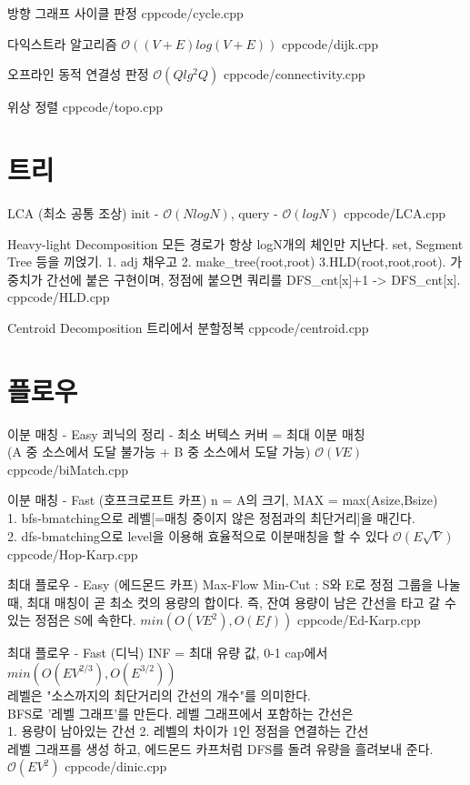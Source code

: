 \documentclass[landscape, 10pt, a4paper, oneside, twocolumn]{extarticle}
\begin{document}
\Algorithm
{방향 그래프 사이클 판정}
{}
{}
{cpp}{code/cycle.cpp}

\Algorithm
{다익스트라 알고리즘}
{}
{$\mathcal{O}((V+E)log(V+E))$}
{cpp}{code/dijk.cpp}

\Algorithm
{오프라인 동적 연결성 판정}
{}
{$\mathcal{O}(Qlg^2Q)$}
{cpp}{code/connectivity.cpp}

\Algorithm
{위상 정렬}
{}
{}
{cpp}{code/topo.cpp}


\section{트리}

\Algorithm
{LCA (최소 공통 조상)}
{}
{init - $\mathcal{O}(NlogN)$, query - $\mathcal{O}(logN)$}
{cpp}{code/LCA.cpp}

\Algorithm
{Heavy-light Decomposition}
{모든 경로가 항상 logN개의 체인만 지난다. set, Segment Tree 등을 끼얹기. 1. adj 채우고 2. make\_tree(root,root) 3.HLD(root,root,root). 가중치가 간선에 붙은 구현이며, 정점에 붙으면 쿼리를 DFS\_cnt[x]+1 -> DFS\_cnt[x].
}
{}
{cpp}{code/HLD.cpp}

\Algorithm
{Centroid Decomposition}
{트리에서 분할정복
}
{}
{cpp}{code/centroid.cpp}




\section{플로우}

\Algorithm
{이분 매칭 - Easy}
{ 쾨닉의 정리 - 최소 버텍스 커버 = 최대 이분 매칭
\\(A 중 소스에서 도달 불가능 + B 중 소스에서 도달 가능)}
{$\mathcal{O}(VE)$}
{cpp}{code/biMatch.cpp}

\Algorithm
{이분 매칭 - Fast (호프크로프트 카프)}
{n = A의 크기, MAX = max(Asize,Bsize)\\
1. bfs-bmatching으로 레벨[=매칭 중이지 않은 정점과의 최단거리]을 매긴다.\\
2. dfs-bmatching으로 level을 이용해 효율적으로 이분매칭을 할 수 있다
}
{$\mathcal{O}(E \sqrt{V})$}
{cpp}{code/Hop-Karp.cpp}

\Algorithm
{최대 플로우 - Easy (에드몬드 카프)}
{Max-Flow Min-Cut : S와 E로 정점 그룹을 나눌 때, 최대 매칭이 곧 최소 컷의 용량의 합이다. 즉, 잔여 용량이 남은 간선을 타고 갈 수 있는 정점은 S에 속한다.}
{$\mathcal {}min({O}(VE^2), {O}(Ef))$}
{cpp}{code/Ed-Karp.cpp}

\Algorithm
{최대 플로우 - Fast (디닉)}
{INF = 최대 유량 값, 0-1 cap에서 $\mathcal {}min({O}(EV^{2/3}), {O}(E^{3/2}))$\\
레벨은 "소스까지의 최단거리의 간선의 개수"를 의미한다.\\
BFS로 '레벨 그래프'를 만든다. 레벨 그래프에서 포함하는 간선은\\
1. 용량이 남아있는 간선 2. 레벨의 차이가 1인 정점을 연결하는 간선\\
레벨 그래프를 생성 하고, 에드몬드 카프처럼 DFS를 돌려 유량을 흘려보내 준다.
}
{$\mathcal{O}(EV^2)$}
{cpp}{code/dinic.cpp}
\end{document}
